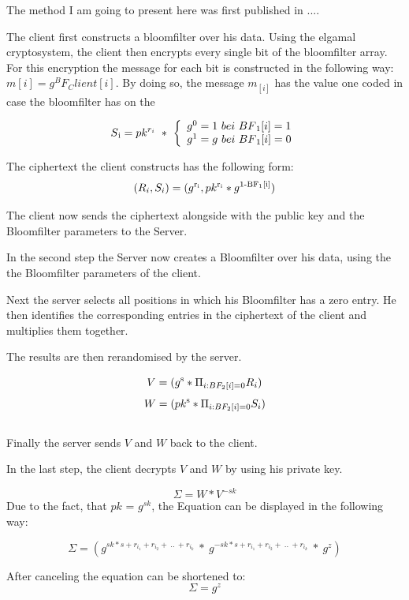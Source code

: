 \documentclass[10pt,a4paper,oneside,twocolumn]{article}
\begin{document}
The method I am going to present here was first published in ....

The client first constructs a bloomfilter over his data. 
Using the elgamal cryptosystem, the client then encrypts every single bit of the bloomfilter array. 
For this encryption the message for each bit is constructed in the following way: $m[i] = g^BF_Client[i]$.
By doing so, the message $ m_[i] $ has the value one coded in case the bloomfilter has on the 

\[
S\textsubscript{i} = pk^{r_{i}} \ * \ \left\{
\begin{array}{ll}
g^{0} = 1 \ bei \  BF\textsubscript{1}[i]=1\\
g^{1} = g \ bei \ BF\textsubscript{1}[i]=0\\
\end{array}
\right.
\]

The ciphertext the client constructs has the following form: $$(R_i, S_i) = (g \textsuperscript{r\textsubscript{i}} , pk\textsuperscript{r\textsubscript{i}} * g\textsuperscript{1-BF\textsubscript{1}[i]})$$

The client now sends the ciphertext alongside with the public key and the Bloomfilter parameters to the Server.

In the second step the Server now creates a Bloomfilter over his data, using the the Bloomfilter parameters of the client.

Next the server selects all positions in which his Bloomfilter has a zero entry. 
He then identifies the corresponding entries in the ciphertext of the client and multiplies them together.

The results are then rerandomised by the  server.

$$ V = (g \textsuperscript{s} * \Pi_{i:BF_{2}[i] = 0} R_{i} )$$
$$ W = (pk \textsuperscript{s} * \Pi_{i:BF_{2}[i] = 0} S_{i} )$$ \\

Finally the server sends $ V $ and $ W $ back to the client.

In the last step, the client decrypts $ V $ and $ W $ by using his private key.

$$\Sigma = W * V^{-sk}$$
Due to the fact, that  $pk$ = $g^{sk}$, the Equation can be displayed in the following way:

$$\Sigma = (g^{sk * s + r_{i_{1}} + r_{i_{2}} + \ ..\ +r_{i_{k}}} \ * \ g^{-sk * s + r_{i_{1}} + r_{i_{2}} + \ ..\ +r_{i_{k}}} \ * \ g^z) $$

After canceling the equation can be shortened to:
$$\Sigma = g^z$$
\end{document}
